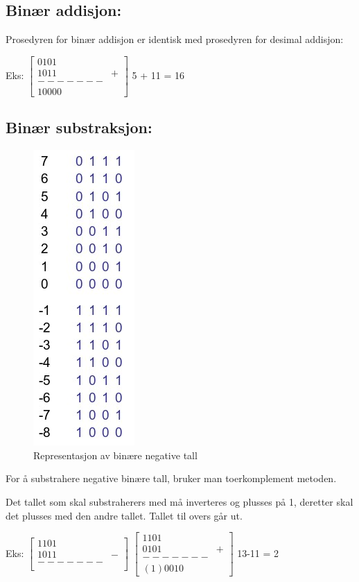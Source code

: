 \documentclass{article}
\begin{document}
	\subsection{Binær addisjon:}
	 Prosedyren for binær addisjon er identisk med prosedyren for desimal addisjon:
	 
	 Eks: 
	 $\begin{bmatrix}
	 0 1 0 1 \\
	 1 0 1 1 & + \\
	 ------- \\
	 1 0 0 0 0
	 \end{bmatrix}$
	5 + 11 = 16
	\subsection{Binær substraksjon:}
	\begin{figure}[H]
		\includegraphics[scale = 0.7]{Nega.jpg}
		\caption{Representasjon av binære negative tall}
	\end{figure}
	
	For å substrahere negative binære tall, bruker man toerkomplement metoden.
	
	Det tallet som skal substraherers med må inverteres og plusses på 1, deretter skal det plusses med den andre tallet. Tallet til overs går ut.
	
	Eks: 
	$\begin{bmatrix}
	1 1 0 1 \\
	1 0 1 1 & -\\
	------- \\
	\end{bmatrix}$ 
	$\begin{bmatrix}
	1 1 0 1 \\
	0 1 0 1 & +\\
	------- \\
	(1) 0 0 1 0
	\end{bmatrix}$
	13-11 = 2
	
\end{document}
